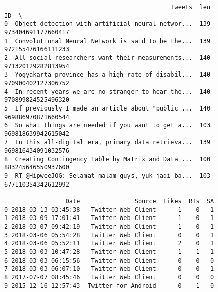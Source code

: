 \documentclass[11pt]{article}
\begin{document}
    
    \begin{verbatim}
                                              Tweets  len                  ID  \
0  Object detection with artificial neural networ...  139  973404691177660417   
1  Convolutional Neural Network is said to be the...  139  972155476166111233   
2  All social researchers want their measurements...  140  971320129282813954   
3  Yogyakarta province has a high rate of disabil...  140  970900402127306752   
4  In recent years we are no stranger to hear the...  140  970899824525496320   
5  If previously I made an article about "public ...  140  969886970871660544   
6  So what things are needed if you want to get a...  103  969818639942615042   
7  In this all-digital era, primary data retrieva...  139  969816434091032576   
8  Creating Contingency Table by Matrix and Data ...  100  883245646550937600   
9  RT @HipweeJOG: Selamat malam guys, yuk jadi ba...  103  677110354342612992   

                 Date               Source  Likes  RTs  SA  
0 2018-03-13 03:45:38   Twitter Web Client      1    0  -1  
1 2018-03-09 17:01:41   Twitter Web Client      1    0   1  
2 2018-03-07 09:42:19   Twitter Web Client      1    0   1  
3 2018-03-06 05:54:28   Twitter Web Client      0    0   1  
4 2018-03-06 05:52:11   Twitter Web Client      2    0   1  
5 2018-03-03 10:47:28   Twitter Web Client      1    1  -1  
6 2018-03-03 06:15:56   Twitter Web Client      0    0   0  
7 2018-03-03 06:07:10   Twitter Web Client      0    0   1  
8 2017-07-07 08:45:46   Twitter Web Client      0    0   0  
9 2015-12-16 12:57:43  Twitter for Android      0    1   0  
    \end{verbatim}
\end{document}
